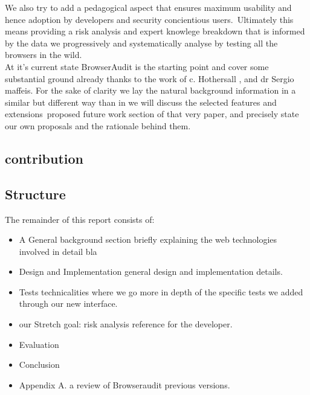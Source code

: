 \documentclass[a4paper,12pt]{report}
\begin{document}
We also try to add a pedagogical aspect that ensures maximum usability and hence adoption by developers and security concientious users.\ 
Ultimately this means providing a risk analysis and expert knowlege breakdown that is informed by the data we progressively and systematically analyse by testing all the browsers in the wild.\\

At it's current state BrowserAudit is the starting point and cover some substantial ground already thanks to the work of c. Hothersall , and dr Sergio maffeis.
For the sake of clarity we lay the natural background information in a similar but different way than in \cite{maffeis}  we will discuss the selected features and extensions\
proposed future work section of that very paper, and precisely state our own proposals and the rationale behind them.\\

\subsection{contribution}

\subsection{Structure}
The remainder of this report consists of:
\begin{itemize}
 \item A General background section briefly explaining the web technologies involved in detail bla
 \item Design and Implementation general design and implementation details.
 \item Tests technicalities where we go more in depth of the specific tests we added through our new interface.
 \item our Stretch goal: risk analysis reference for the developer.
 \item Evaluation
 \item Conclusion
 \item Appendix A. a review of Browseraudit previous versions. 
\end{itemize}










\appendix

\end{document}
